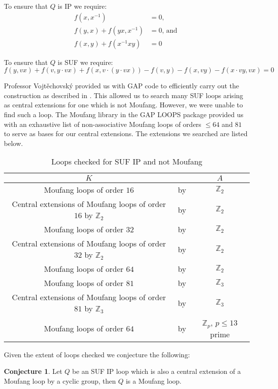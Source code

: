 \documentclass[12pt]{report}
\theoremstyle{definition}
\newtheorem{cnj}[thm]{Conjecture}
\newcommand{\ZZZ}{\mathbb{Z}}
\begin{document}
To ensure that $Q$ is IP we require:
  \begin{align*}
    f(x, x^{-1}) &= 0,\\
    f(y, x) + f(yx, x^{-1}) &= 0\text{, and }\\
    f(x, y) + f(x^{-1} xy) &= 0
  \end{align*}

To ensure that $Q$ is SUF we require:
\[f(y, vx) + f(v, y\cdot vx) + f(x, v\cdot(y\cdot vx)) - f(v, y) - f(x, vy) - f(x\cdot vy, vx) = 0\]

Professor Vojt\v{e}chovsk\'{y} provided us with GAP code to efficiently carry out the construction
as described in \cite{64and81}. This allowed us to search many SUF loops arising as central extensions
for one which is not Moufang. However, we were unable to find such a loop. The Moufang library in the
GAP LOOPS package provided us with an exhaustive list of non-associative Moufang loops of orders
$\leq 64$ and $81$ to serve as bases for our central extensions. The extensions we searched are listed below.

\begin{table}[H]
  \centering
  \begin{tabular}{c|c|c}
    $K$ &  & $A$\\
    \hline
    Moufang loops of order $16$ & by & $\ZZZ_2$\\
    Central extensions of Moufang loops of order $16$ by $\ZZZ_2$ & by & $\ZZZ_2$\\
    Moufang loops of order $32$ & by & $\ZZZ_2$\\
    Central extensions of Moufang loops of order $32$ by $\ZZZ_2$ & by & $\ZZZ_2$\\
    Moufang loops of order $64$ & by & $\ZZZ_2$\\
    Moufang loops of order $81$ & by & $\ZZZ_3$\\
    Central extensions of Moufang loops of order $81$ by $\ZZZ_3$ & by & $\ZZZ_3$\\
    Moufang loops of order $64$ & by & $\ZZZ_p$, $p \leq 13$ prime
  \end{tabular}
  \caption{Loops checked for SUF IP and not Moufang}
\end{table}

Given the extent of loops checked we conjecture the following:

\begin{cnj}
  Let $Q$ be an SUF IP loop which is also a central extension of a Moufang loop by a cyclic group,
    then $Q$ is a Moufang loop.
\end{cnj}
\end{document}
